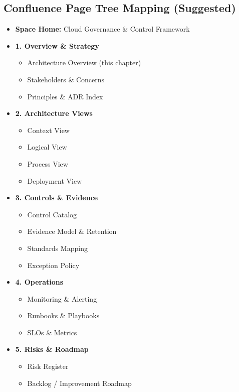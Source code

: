 \documentclass[11pt]{report}
\begin{document}
\subsection{Confluence Page Tree Mapping (Suggested)}
\begin{itemize}
  \item \textbf{Space Home:} Cloud Governance \& Control Framework
  \item \textbf{1. Overview \& Strategy}
    \begin{itemize}
      \item Architecture Overview (this chapter)
      \item Stakeholders \& Concerns
      \item Principles \& ADR Index
    \end{itemize}
  \item \textbf{2. Architecture Views}
    \begin{itemize}
      \item Context View
      \item Logical View
      \item Process View
      \item Deployment View
    \end{itemize}
  \item \textbf{3. Controls \& Evidence}
    \begin{itemize}
      \item Control Catalog
      \item Evidence Model \& Retention
      \item Standards Mapping
      \item Exception Policy
    \end{itemize}
  \item \textbf{4. Operations}
    \begin{itemize}
      \item Monitoring \& Alerting
      \item Runbooks \& Playbooks
      \item SLOs \& Metrics
    \end{itemize}
  \item \textbf{5. Risks \& Roadmap}
    \begin{itemize}
      \item Risk Register
      \item Backlog / Improvement Roadmap
    \end{itemize}
\end{itemize}
\end{document}
